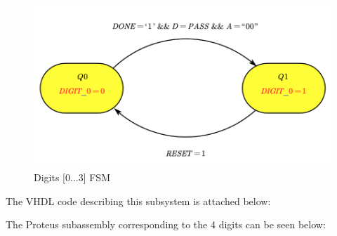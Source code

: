 \begin{figure}[H]
    \centering
    \includegraphics[scale = 0.6]{Graphics/DIGITS/DIGITS_FSM.pdf}
    \caption{Digits [0...3] FSM}
    \label{fig:DIGITS_FSM}
\end{figure}


\clearpage

The VHDL code describing this subsystem is attached below:


\clearpage

The Proteus subassembly corresponding to the 4 digits can be seen below:

